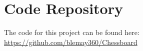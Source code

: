 \documentclass[journal]{IEEEtran}
\begin{document}
\appendices
\section{Code Repository}
The code for this project can be found here: \url{https://github.com/blemay360/Chessboard}


\ifCLASSOPTIONcaptionsoff
  \newpage
\fi





\printbibliography

\end{document}
